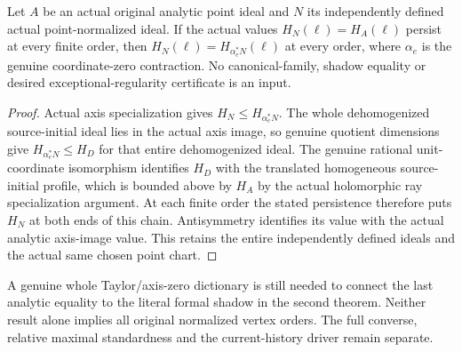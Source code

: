 \begin{theorem}
\label{hir:actual-original-point-persistent-hs-axis-profile}
\leanok
Let $A$ be an actual original analytic point ideal and $N$ its
independently defined actual point-normalized ideal. If the actual
values $H_N(\ell)=H_A(\ell)$ persist at every finite order, then
$H_N(\ell)=H_{\alpha_e^*N}(\ell)$ at every order, where $\alpha_e$
is the genuine coordinate-zero contraction. No canonical-family,
shadow equality or desired exceptional-regularity certificate is an
input.
\end{theorem}
\begin{proof}
Actual axis specialization gives $H_N\le H_{\alpha_e^*N}$.
The whole dehomogenized source-initial ideal lies in the actual
axis image, so genuine quotient dimensions give
$H_{\alpha_e^*N}\le H_{D}$ for that entire dehomogenized ideal.
The genuine rational unit-coordinate isomorphism identifies $H_D$
with the translated homogeneous source-initial profile, which is
bounded above by $H_A$ by the actual holomorphic ray specialization
argument. At each finite order the stated persistence therefore puts
$H_N$ at both ends of this chain. Antisymmetry identifies its value
with the actual analytic axis-image value. This retains the entire
independently defined ideals and the actual same chosen point chart.
\end{proof}

A genuine whole Taylor/axis-zero dictionary is still needed to connect
the last analytic equality to the literal formal shadow in the second
theorem. Neither result alone implies all original normalized vertex
orders. The full converse, relative maximal standardness and the
current-history driver remain separate.
